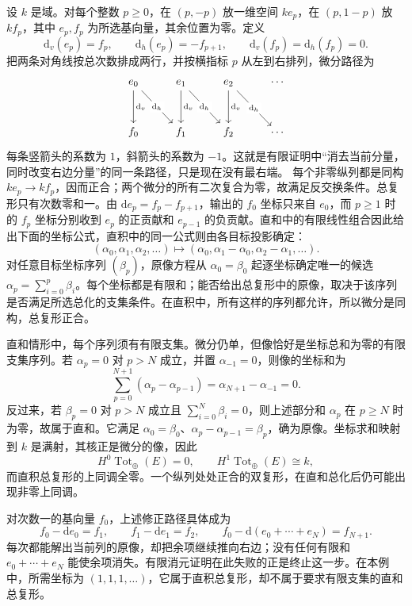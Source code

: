 \begin{example}\label{b4:exm:sum-product-total-difference}
	设 \(k\) 是域。对每个整数 \(p\ge0\)，在 \((p,-p)\) 放一维空间 \(k e_p\)，在 \((p,1-p)\) 放 \(k f_p\)，其中 \(e_p,f_p\) 为所选基向量，其余位置为零。定义
	\[
		\mathrm{d}_v(e_p)=f_p,\qquad \mathrm{d}_h(e_p)=-f_{p+1},\qquad \mathrm{d}_v(f_p)=\mathrm{d}_h(f_p)=0.
	\]
	把两条对角线按总次数排成两行，并按横指标 \(p\) 从左到右排列，微分路径为
	\[
		\begin{tikzcd}[column sep=2.5em,row sep=3em]
			e_0\arrow[d,"\mathrm{d}_v"]\arrow[dr,"\mathrm{d}_h" description]& e_1\arrow[d,"\mathrm{d}_v"]\arrow[dr,"\mathrm{d}_h" description]& e_2\arrow[d,"\mathrm{d}_v"]\arrow[dr,"\mathrm{d}_h" description]&\cdots\\
			f_0&f_1&f_2&\cdots
		\end{tikzcd}
	\]
	每条竖箭头的系数为 \(1\)，斜箭头的系数为 \(-1\)。这就是有限证明中“消去当前分量，同时改变右边分量”的同一条路径，只是现在没有最右端。 每个非零纵列都是同构 \(k e_p\to k f_p\)，因而正合；两个微分的所有二次复合为零，故满足反交换条件。总复形只有次数零和一。由 \(\mathrm{d}e_p=f_p-f_{p+1}\)，输出的 \(f_0\) 坐标只来自 \(e_0\)，而 \(p\ge1\) 时的 \(f_p\) 坐标分别收到 \(e_p\) 的正贡献和 \(e_{p-1}\) 的负贡献。直和中的有限线性组合因此给出下面的坐标公式，直积中的同一公式则由各目标投影确定：
	\[
		(\alpha_0,\alpha_1,\alpha_2,\ldots)\longmapsto (\alpha_0,\alpha_1-\alpha_0,\alpha_2-\alpha_1,\ldots).
	\]
	对任意目标坐标序列 \((\beta_p)\)，原像方程从 \(\alpha_0=\beta_0\) 起逐坐标确定唯一的候选 \(\alpha_p=\sum_{i=0}^p\beta_i\)。每个坐标都是有限和；能否给出总复形中的原像，取决于该序列是否满足所选总化的支集条件。在直积中，所有这样的序列都允许，所以微分是同构，总复形正合。

	\ProseParagraphBreak
	直和情形中，每个序列须有有限支集。微分仍单，但像恰好是坐标总和为零的有限支集序列。若 \(\alpha_p=0\) 对 \(p>N\) 成立，并置 \(\alpha_{-1}=0\)，则像的坐标和为
	\[
		\sum_{p=0}^{N+1}(\alpha_p-\alpha_{p-1}) =\alpha_{N+1}-\alpha_{-1}=0.
	\]
	反过来，若 \(\beta_p=0\) 对 \(p>N\) 成立且 \(\sum_{i=0}^N\beta_i=0\)，则上述部分和 \(\alpha_p\) 在 \(p\ge N\) 时为零，故属于直和。它满足 \(\alpha_0=\beta_0\)、\(\alpha_p-\alpha_{p-1}=\beta_p\)，确为原像。坐标求和映射到 \(k\) 是满射，其核正是微分的像，因此
	\[
		H^0\operatorname{Tot}_{\oplus}(E)=0,\qquad H^1\operatorname{Tot}_{\oplus}(E)\cong k,
	\]
	而直积总复形的上同调全零。一个纵列处处正合的双复形，在直和总化后仍可能出现非零上同调。
\end{example}

对次数一的基向量 \(f_0\)，上述修正路径具体成为
\[
	f_0-\mathrm{d}e_0=f_1,\qquad f_1-\mathrm{d}e_1=f_2,\qquad f_0-\mathrm{d}(e_0+\cdots+e_N)=f_{N+1}.
\]
每次都能解出当前列的原像，却把余项继续推向右边；没有任何有限和 \(e_0+\cdots+e_N\) 能使余项消失。有限消元证明在此失败的正是终止这一步。在本例中，所需坐标为 \((1,1,1,\ldots)\)，它属于直积总复形，却不属于要求有限支集的直和总复形。

